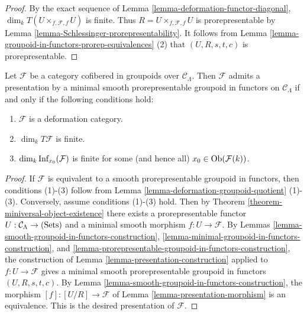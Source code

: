 \begin{proof}
By the exact sequence of Lemma \ref{lemma-deformation-functor-diagonal}, 
$\dim_{k} T(U \times_{f,\mathcal F,f} U)$ is finite.  Thus $R =U 
\times_{f,\mathcal F,f} U$ is prorepresentable by Lemma 
\ref{lemma-Schlessinger-prorepresentability}. It follows from Lemma 
\ref{lemma-groupoid-in-functors-prorep-equivalences} (2) that $(U,R,s,t,c)$ is 
prorepresentable.
\end{proof}

\begin{theorem}
\label{theorem-presentation-deformation-groupoid}
Let $\mathcal F$ be a category cofibered in groupoids over $\mathcal 
C_{\Lambda}$.  Then $\mathcal F$ admits a presentation by a minimal smooth 
prorepresentable groupoid in functors on $\mathcal C_{\Lambda}$ if and only if 
the following conditions hold:
\begin{enumerate}
\item $\mathcal F$ is a deformation category.
\item $\dim_k T\mathcal F$ is finite.
\item $\dim_k \textnormal{Inf}_{x_0}(\mathcal F)$ is finite for some (and hence 
all) $x_0 \in \textnormal{Ob}(\mathcal F(k))$.
\end{enumerate}
\end{theorem}

\begin{proof}
If $\mathcal F$ is equivalent to a smooth prorepresentable groupoid in 
functors, then conditions (1)-(3) follow from Lemma 
\ref{lemma-deformation-groupoid-quotient} (1)-(3).  Conversely, assume 
conditions (1)-(3) hold. Then by Theorem 
\ref{theorem-miniversal-object-existence} there exists a prorepresentable 
functor $U: \mathcal C_{\Lambda} \rightarrow \textnormal{(Sets)}$ and a minimal 
smooth morphism $f: U \rightarrow \mathcal F$.  By Lemmas 
\ref{lemma-smooth-groupoid-in-functors-construction}, 
\ref{lemma-minimal-groupoid-in-functors-construction}, and 
\ref{lemma-prorepresentable-groupoid-in-functors-construction}, the 
construction of Lemma \ref{lemma-presentation-construction} applied to $f: U 
\rightarrow \mathcal F$ gives a minimal smooth prorepresentable groupoid in 
functors $(U,R,s,t,c)$. By Lemma 
\ref{lemma-smooth-groupoid-in-functors-construction}, the morphism $[f]: [U/R] 
\rightarrow \mathcal F$ of Lemma \ref{lemma-presentation-morphism} is an 
equivalence.  This is the desired presentation of $\mathcal F$.
\end{proof}



